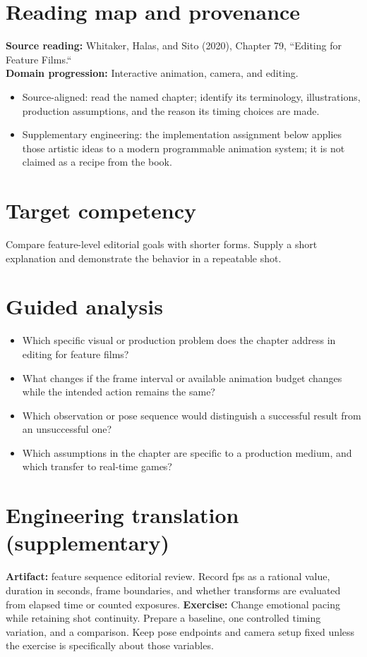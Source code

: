\documentclass[10pt,letterpaper]{article}
\begin{document}
\makedoctitle
\makedocsummary

\section{Reading map and provenance}
\textbf{Source reading:} Whitaker, Halas, and Sito (2020), Chapter 79, ``Editing for Feature Films.``\\
\textbf{Domain progression:} Interactive animation, camera, and editing.
\begin{itemize}
\item Source-aligned: read the named chapter; identify its terminology, illustrations, production assumptions, and the reason its timing choices are made.
\item Supplementary engineering: the implementation assignment below applies those artistic ideas to a modern programmable animation system; it is not claimed as a recipe from the book.
\end{itemize}
\section{Target competency}
Compare feature-level editorial goals with shorter forms. Supply a short explanation and demonstrate the behavior in a repeatable shot.
\section{Guided analysis}
\begin{itemize}
\item Which specific visual or production problem does the chapter address in editing for feature films?
\item What changes if the frame interval or available animation budget changes while the intended action remains the same?
\item Which observation or pose sequence would distinguish a successful result from an unsuccessful one?
\item Which assumptions in the chapter are specific to a production medium, and which transfer to real-time games?
\end{itemize}
\section{Engineering translation (supplementary)}
\textbf{Artifact:} feature sequence editorial review. Record fps as a rational value, duration in seconds, frame boundaries, and whether transforms are evaluated from elapsed time or counted exposures.
\textbf{Exercise:} Change emotional pacing while retaining shot continuity. Prepare a baseline, one controlled timing variation, and a comparison. Keep pose endpoints and camera setup fixed unless the exercise is specifically about those variables.
\end{document}
